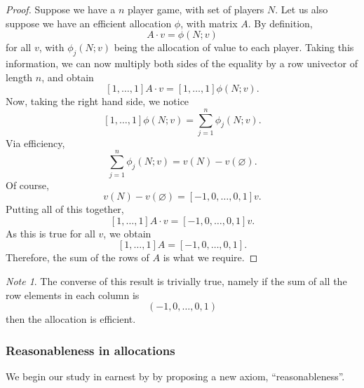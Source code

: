 \documentclass[12pt,letterpaper,final]{article}
\theoremstyle{plain}
\theoremstyle{plain}
\theoremstyle{plain}
\theoremstyle{plain}
\theoremstyle{plain}
\theoremstyle{plain}
\theoremstyle{plain}
\theoremstyle{definition}
\theoremstyle{definition}
\theoremstyle{definition}
\theoremstyle{definition}
\theoremstyle{definition}
\theoremstyle{remark}
\theoremstyle{remark}
\newtheorem*{note}{Note}
\theoremstyle{remark}
\theoremstyle{remark}
\begin{document}
\begin{proof}
  \begin{comment}
    This more efficient method of proof would be used
    in a journal version of this result. Historically, this style of
    proof was used by Einstein, too.
  \end{comment}
  Suppose we have a \(n\) player game, with set of players \(N\).
  Let us also suppose we have an efficient allocation \(\phi\), with
  matrix \(A\). 
  By definition,
  \[
    A\cdot v = \phi(N;v)
  \]
  for all \(v\),
  with \(\phi_j(N;v)\) being the allocation of value to each player.
  Taking this information, we can now multiply both sides of the
  equality by a row univector of length \(n\), and obtain
  \[
    [1, \ldots, 1] A\cdot v = [1, \ldots, 1] \phi(N;v).
  \]
  Now, taking the right hand side, we notice
  \[
    [1, \ldots, 1] \phi(N;v)= \sum_{j=1}^n \phi_j(N;v).
  \]
  Via efficiency,
  \[
    \sum_{j=1}^n \phi_j(N;v) = v(N) - v(\varnothing).
  \]
  Of course,
  \[
    v(N) - v(\varnothing) = [-1, 0, \ldots, 0, 1] v.
  \]
  Putting all of this together,
  \[
    [1, \ldots, 1]A\cdot v = [-1, 0, \ldots, 0, 1] v.
  \]
  As this is true for all \(v\), we obtain
  \[
    [1, \ldots, 1]A = [-1, 0, \ldots, 0, 1].
  \]
  Therefore, the sum of the rows of \(A\) is what we require.
\end{proof}

\begin{note}
  The converse of this result is trivially true, namely if the sum of
  all the row elements in each column is
  \[
    \left(-1 , 0 , \ldots , 0 , 1\right)
  \]
  then the allocation is efficient. 
\end{note}

\subsubsection{Reasonableness in allocations}

We begin our study in earnest by by proposing a new axiom,
``reasonableness''.
\end{document}
